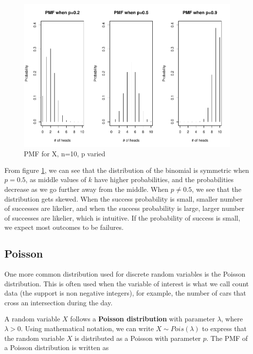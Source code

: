 \documentclass[
]{book}
\begin{document}
\begin{figure}
\centering
\includegraphics{bookdown-demo_files/figure-latex/3-pmfs-1.pdf}
\caption{\label{fig:3-pmfs}PMF for X, n=10, p varied}
\end{figure}

From figure \ref{fig:3-pmfs}, we can see that the distribution of the binomial is symmetric when \(p=0.5\), as middle values of \(k\) have higher probabilities, and the probabilities decrease as we go further away from the middle. When \(p \neq 0.5\), we see that the distribution gets skewed. When the success probability is small, smaller number of successes are likelier, and when the success probability is large, larger number of successes are likelier, which is intuitive. If the probability of success is small, we expect most outcomes to be failures.

\hypertarget{poisson}{%
\subsection{Poisson}\label{poisson}}

One more common distribution used for discrete random variables is the Poisson distribution. This is often used when the variable of interest is what we call count data (the support is non negative integers), for example, the number of cars that cross an intersection during the day.

A random variable \(X\) follows a \textbf{Poisson distribution} with parameter \(\lambda\), where \(\lambda>0\). Using mathematical notation, we can write \(X \sim Pois(\lambda)\) to express that the random variable \(X\) is distributed as a Poisson with parameter \(p\). The PMF of a Poisson distribution is written as
\end{document}
